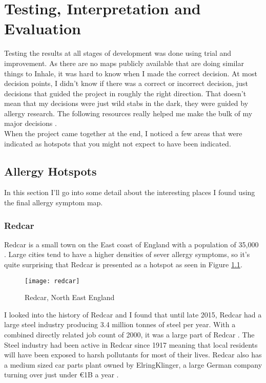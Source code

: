 \chapter{Testing, Interpretation and Evaluation}
\label{cha:tande}
 
Testing the results at all stages of development was done using trial and improvement. As there are no maps publicly available that are doing similar things to Inhale, it was hard to know when I made the correct decision. At most decision points, I didn't know if there was a correct or incorrect decision, just decisions that guided the project in roughly the right direction. That doesn't mean that my decisions were just wild stabs in the dark, they were guided by allergy research. The following resources really helped me make the bulk of my major decisions \cite{childhood, rhinitis, co2pollen, waldo}.\\
 
When the project came together at the end, I noticed a few areas that were indicated as hotspots that you might not expect to have been indicated.

\section{Allergy Hotspots}

In this section I'll go into some detail about the interesting places I found using the final allergy symptom map.

\subsection{Redcar}

Redcar is a small town on the East coast of England with a population of 35,000 \cite{redcarpop}. Large cities tend to have a higher densities of sever allergy symptoms, so it's quite surprising that Redcar is presented as a hotspot as seen in Figure \ref{fig:redcar}.\\

\begin{figure}[H]
\begin{center}
\texttt{[image: redcar]}
\caption{Redcar, North East England}
\label{fig:redcar}
\end{center}
\end{figure}

I looked into the history of Redcar and I found that until late 2015, Redcar had a large steel industry producing 3.4 million tonnes of steel per year. With a combined directly related job count of 2000, it was a large part of Redcar \cite{bbcredcar}. The Steel industry had been active in Redcar since 1917 meaning that local residents will have been exposed to harsh pollutants for most of their lives. Redcar also has a medium sized car parts plant owned by ElringKlinger, a large German company turning over just under €1B a year \cite{guardez}.\\

